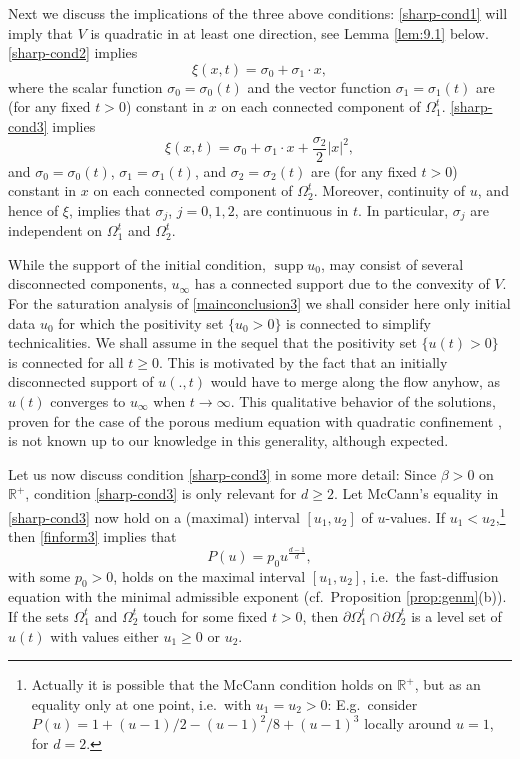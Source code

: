 \documentclass[reqno]{amsart}
\newcommand{\R}{\mathbb{R}}
\DeclareMathOperator{\supp}{supp}
\begin{document}
Next we discuss the implications of the three above conditions: \eqref{sharp-cond1} will imply that $V$ is quadratic in at least one direction, see Lemma \ref{lem:9.1} below. \eqref{sharp-cond2} implies 
\begin{equation}\label{xi-form1}
   \xi(x,t)=\sigma_0+\sigma_1\cdot x,
\end{equation}
where the scalar function $\sigma_0=\sigma_0(t)$ and the vector function $\sigma_1=\sigma_1(t)$ are (for any fixed $t>0$) constant in $x$ on each connected component of $\Omega_1^t$. \eqref{sharp-cond3} implies 
\begin{equation}\label{xi-form2}
  \xi(x,t)=\sigma_0+\sigma_1\cdot x+\frac{\sigma_2}{2} |x|^2,
\end{equation}
and $\sigma_0=\sigma_0(t)$, $\sigma_1=\sigma_1(t)$, and $\sigma_2=\sigma_2(t)$ are (for any fixed $t>0$) constant in $x$ on each connected component of $\Omega_2^t$. Moreover, continuity of $u$, and hence of $\xi$, implies that $\sigma_j$, $j=0,1,2$, are continuous in $t$. In particular, $\sigma_j$ are independent on $\Omega_1^t$ and $\Omega_2^t$.

While the support of the initial condition, $\supp u_0$, may consist of several disconnected components, $u_\infty$ has a connected support due to the convexity of $V$. 
For the saturation analysis of \eqref{mainconclusion3} we shall consider here only initial data $u_0$ for which the positivity set $\{u_0>0\}$ is connected to simplify technicalities. We shall assume in the sequel that the positivity set $\{u(t)>0\}$ is connected for all $t\ge0$. This is motivated by the fact that an initially disconnected support of $u(.,t)$ would have to merge along the flow anyhow, as $u(t)$ converges to $u_\infty$ when $t\to\infty$. This qualitative behavior of the solutions, proven for the case of the porous medium equation with quadratic confinement \cite[\S18]{VazquezPME}, is not known up to our knowledge in this generality, although expected. 

Let us now discuss condition \eqref{sharp-cond3}  in some more detail: Since $\beta>0$ on $\R^+$, condition \eqref{sharp-cond3} is only relevant for $d\ge2$. Let McCann's equality in \eqref{sharp-cond3} now hold on a (maximal) interval $[u_1,u_2]$ of $u$-values. If $u_1<u_2$,\footnote{Actually it is possible that the McCann condition holds on $\R^+$, but as an equality only at one point, i.e.\ with $u_1=u_2>0$: E.g.\ consider $P(u)=1+(u-1)/2-(u-1)^2/8+(u-1)^3$ locally around $u=1$, for $d=2$.} then \eqref{finform3} implies that 
\begin{equation}\label{P-fast-diff}
  P(u)=p_0 u^{\frac{d-1}{d}},
\end{equation}
with some $p_0>0$, holds on the maximal interval $[u_1,u_2]$, i.e.\ the fast-diffusion equation with the minimal admissible exponent (cf.\ Proposition \ref{prop:genm}(b)). 
If the sets $\Omega_1^t$ and $\Omega_2^t$ touch for some fixed $t>0$, then $\partial\Omega_1^t\cap\partial\Omega_2^t$ is a level set of $u(t)$ with values either $u_1\geq 0$ or $u_2$. 
\end{document}
